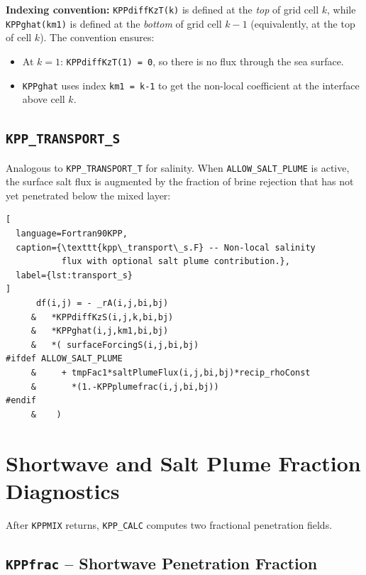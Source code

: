 \documentclass[12pt,letterpaper]{article}
\begin{document}
\begin{infobox}  
\textbf{Indexing convention:} \texttt{KPPdiffKzT(k)} is defined at the  
\textit{top} of grid cell $k$, while \texttt{KPPghat(km1)} is defined  
at the \textit{bottom} of grid cell $k-1$ (equivalently, at the top of  
cell $k$). The convention ensures:  
\begin{itemize}  
  \item At $k=1$: \texttt{KPPdiffKzT(1) = 0}, so there is no flux  
        through the sea surface.  
  \item \texttt{KPPghat} uses index \texttt{km1 = k-1} to get the  
        non-local coefficient at the interface above cell $k$.  
\end{itemize}  
\end{infobox}  
  
\subsection{\texttt{KPP\_TRANSPORT\_S}}  
  
Analogous to \texttt{KPP\_TRANSPORT\_T} for salinity. When  
\texttt{ALLOW\_SALT\_PLUME} is active, the surface salt flux is  
augmented by the fraction of brine rejection that has not yet  
penetrated below the mixed layer:  
  
\begin{lstlisting}[  
  language=Fortran90KPP,  
  caption={\texttt{kpp\_transport\_s.F} -- Non-local salinity  
           flux with optional salt plume contribution.},  
  label={lst:transport_s}  
]  
      df(i,j) = - _rA(i,j,bi,bj)  
     &   *KPPdiffKzS(i,j,k,bi,bj)  
     &   *KPPghat(i,j,km1,bi,bj)  
     &   *( surfaceForcingS(i,j,bi,bj)  
#ifdef ALLOW_SALT_PLUME  
     &     + tmpFac1*saltPlumeFlux(i,j,bi,bj)*recip_rhoConst  
     &       *(1.-KPPplumefrac(i,j,bi,bj))  
#endif  
     &    )  
\end{lstlisting}  
  
\section{Shortwave and Salt Plume Fraction Diagnostics}  
  
After \texttt{KPPMIX} returns, \texttt{KPP\_CALC} computes two  
fractional penetration fields.  
  
\subsection{\texttt{KPPfrac} -- Shortwave Penetration Fraction}  
  
\end{document}
